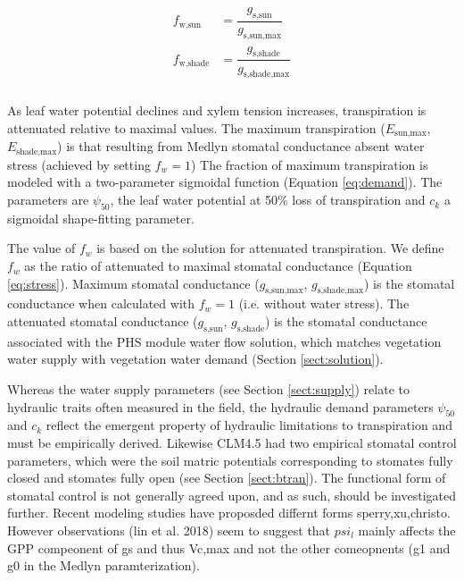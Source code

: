 \documentclass[draft,linenumbers]{agujournal}
\begin{document}
    
     \begin{linenomath*}
     \begin{eqnarray}
     \begin{aligned}
     \label{eq:stress}
     f_{\text{w,sun}}         &= \dfrac{g_{\text{s,sun}}}{g_{\text{s,sun,max}}} \\
     f_{\text{w,shade}}     &= \dfrac{g_{\text{s,shade}}}{g_{\text{s,shade,max}}} \\
     \end{aligned}
     \end{eqnarray}
     \end{linenomath*}
    
     As leaf water potential declines and xylem tension increases, transpiration is attenuated relative to maximal values.
     The maximum transpiration ($E_{\text{sun,max}}$, $E_{\text{shade,max}}$) is that resulting from Medlyn stomatal conductance absent water stress (achieved by setting $f_w=1$)
     The fraction of maximum transpiration is modeled with a two-parameter sigmoidal function (Equation \ref{eq:demand}). 
     The parameters are $\psi_{50}$, the leaf water potential at 50\% loss of transpiration and 
     $c_k$ a sigmoidal shape-fitting parameter.
    
    The value of $f_w$ is based on the solution for attenuated transpiration.
    We define $f_w$ as the ratio of attenuated to maximal stomatal conductance (Equation \ref{eq:stress}).
    Maximum stomatal conductance ($g_{\text{s,sun,max}}$, $g_{\text{s,shade,max}}$) is the stomatal conductance when calculated with $f_w=1$
    (i.e. without water stress). 
    The attenuated stomatal conductance ($g_{\text{s,sun}}$, $g_{\text{s,shade}}$) is the stomatal conductance associated with the PHS module
    water flow solution, which matches vegetation water supply with vegetation water demand 
    (Section \ref{sect:solution}).
    
     Whereas the water supply parameters (see Section \ref{sect:supply}) relate to hydraulic traits often measured in the field, 
     the hydraulic demand parameters $\psi_{50}$ and $c_k$ reflect the emergent property of hydraulic limitations to transpiration and must be empirically derived. 
     Likewise CLM4.5 had two empirical stomatal control parameters, which were the soil matric potentials 
     corresponding to stomates fully closed and stomates fully open (see Section \ref{sect:btran}).
     The functional form of stomatal control is not generally agreed upon, and as such, should be investigated further. 
     Recent modeling studies have proposded differnt forms sperry,xu,christo. 
     However observations (lin et al. 2018) seem to suggest that $psi_l$ mainly affects the GPP compeonent of gs and thus Vc,max and not the other comeopnents (g1 and g0 in the Medlyn paramterization).
\end{document}
